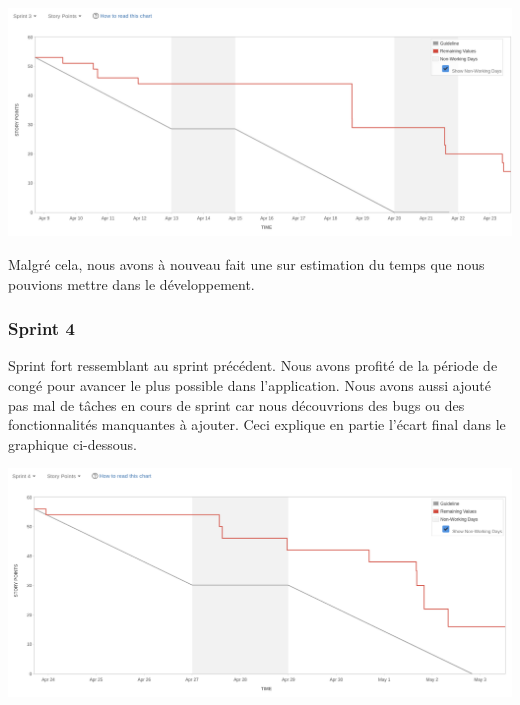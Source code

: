 \documentclass[t, 12pt, usenames,dvipsnames]{article}
\begin{document}
                \begin{center}
                    \includegraphics[scale=.25]{images/graph-new/sprint3.png}
                    \label{fig:sprint3_graph}
                \end{center}
                
                \noindent Malgré cela, nous avons à nouveau fait une sur estimation du temps que nous pouvions mettre dans le développement.
                
                
            \subsubsection{Sprint 4}
                \noindent Sprint fort ressemblant au sprint précédent. Nous avons profité de la période de congé pour avancer le plus possible dans l'application. Nous avons aussi ajouté pas mal de tâches en cours de sprint car nous découvrions des bugs ou des fonctionnalités manquantes à ajouter. 
                Ceci explique en partie l'écart final dans le graphique ci-dessous.
                
                \begin{center}
                    \includegraphics[scale=.25]{images/graph-new/sprint4.png}
                    \label{fig:sprint4_graph}
                \end{center}
        
\end{document}
